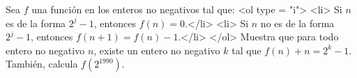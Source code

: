Sea $f$ una función en los enteros no negativos tal que:
<ol type = "i">
<li> Si $n$ es de la forma $2^j-1$, entonces $f(n)=0$.</li>
<li> Si $n$ no es de la forma $2^j-1$, entonces $f(n+1)=f(n)-1$.</li>
</ol>
Muestra que para todo entero no negativo $n$, existe un entero no negativo $k$ tal que $f(n)+n=2^k-1$. También, calcula $f(2^{1990})$.